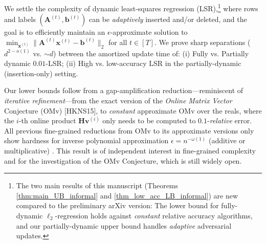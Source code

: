 
We settle the complexity of dynamic least-squares regression (LSR),\footnote{The two main results of this manuscript (Theorems \ref{thm:main_UB_informal} and \ref{thm_low_acc_LB_informal}) are new compared to the preliminary  arXiv version: The lower bound for fully-dynamic $\ell_2$-regression holds against \emph{constant} relative accuracy algorithms, and our partially-dynamic upper bound handles \emph{adaptive} adversarial updates.}  where rows and labels $(\mathbf{A}^{(t)}, \mathbf{b}^{(t)})$ can be \emph{adaptively} inserted and/or deleted, and the goal is to efficiently maintain an $\epsilon$-approximate solution to $\min_{\mathbf{x}^{(t)}} \| \mathbf{A}^{(t)} \mathbf{x}^{(t)} - \mathbf{b}^{(t)} \|_2$ for all $t\in [T]$. We prove sharp  separations ($d^{2-o(1)}$ vs. $\sim d$) between the amortized update time of: (i) Fully vs. Partially dynamic $0.01$-LSR; (ii) High vs. low-accuracy LSR in the partially-dynamic (insertion-only) setting.  

Our lower bounds  follow from a  gap-amplification reduction---reminiscent of  \emph{iterative refinement}---from the exact version of the \emph{Online Matrix Vector} Conjecture (OMv) [HKNS15],  to \emph{constant} approximate OMv  over the reals, where the $i$-th online product $\mathbf{H}\mathbf{v}^{(i)}$ only needs to be computed to $0.1$-\emph{relative} error. All previous fine-grained reductions from OMv to its approximate versions only show hardness for inverse polynomial approximation $\epsilon = n^{-\omega(1)}$ (additive or multiplicative) . This result is of independent interest in fine-grained complexity and for the investigation of the OMv Conjecture, which is still widely open.    
